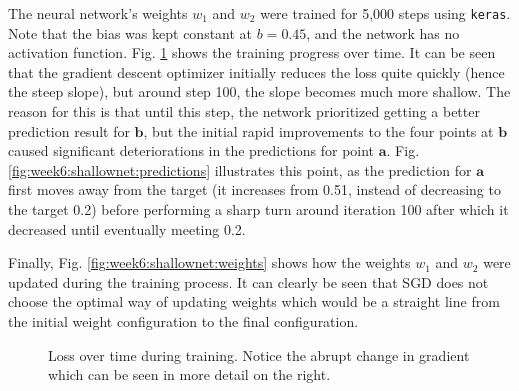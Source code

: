 \documentclass{article}
\renewcommand\vec{\mathbf}
\begin{document}
The neural network's weights $w_1$ and $w_2$ were trained for 5,000 steps using \texttt{keras}. 
Note that the bias was kept constant at $b=0.45$, and the network has no activation function.
Fig. \ref{fig:week6:shallownet:trainingloss} shows the training progress over time. 
It can be seen that the gradient descent optimizer initially reduces the loss quite quickly (hence the steep slope), but around step 100, the slope becomes much more shallow.
The reason for this is that until this step, the network prioritized getting a better prediction result for $\vec{b}$, but the initial rapid improvements to the four points at $\vec{b}$ caused significant deteriorations in the predictions for point $\vec{a}$.
Fig. \ref{fig:week6:shallownet:predictions} illustrates this point, as the prediction for $\vec{a}$ first moves away from the target (it increases from 0.51, instead of decreasing to the target 0.2) before performing a sharp turn around iteration 100 after which it decreased until eventually meeting 0.2.

Finally, Fig. \ref{fig:week6:shallownet:weights} shows how the weights $w_1$ and $w_2$ were updated during the training process. It can clearly be seen that SGD does not choose the optimal way of updating weights which would be a straight line from the initial weight configuration to the final configuration.

\begin{figure}[h]
    \vspace{.05\textwidth}
    \caption{Loss over time during training. Notice the abrupt change in gradient which can be seen in more detail on the right.}
    \label{fig:week6:shallownet:trainingloss}
\end{figure}
\end{document}
